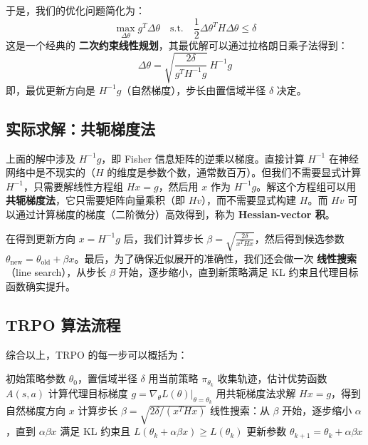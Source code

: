 \documentclass[lang=cn,zihao=-4,a4paper,fontset=windows]{beautybook}
\begin{document}
于是，我们的优化问题简化为：
\[
\max_{\Delta\theta} g^T \Delta\theta \quad \text{s.t.} \quad \frac{1}{2} \Delta\theta^T H \Delta\theta \le \delta
\]
这是一个经典的 \textbf{二次约束线性规划}，其最优解可以通过拉格朗日乘子法得到：
\[
\Delta\theta = \sqrt{\frac{2\delta}{g^T H^{-1} g}} \, H^{-1} g
\]
即，最优更新方向是 \(H^{-1} g\)（自然梯度），步长由置信域半径 \(\delta\) 决定。

\subsection{实际求解：共轭梯度法}

上面的解中涉及 \(H^{-1} g\)，即 Fisher 信息矩阵的逆乘以梯度。直接计算 \(H^{-1}\) 在神经网络中是不现实的（\(H\) 的维度是参数个数，通常数百万）。但我们不需要显式计算 \(H^{-1}\)，只需要解线性方程组 \(H x = g\)，然后用 \(x\) 作为 \(H^{-1} g\)。解这个方程组可以用 \textbf{共轭梯度法}，它只需要矩阵向量乘积（即 \(H v\)），而不需要显式构建 \(H\)。而 \(H v\) 可以通过计算梯度的梯度（二阶微分）高效得到，称为 \textbf{Hessian-vector 积}。

在得到更新方向 \(x = H^{-1} g\) 后，我们计算步长 \(\beta = \sqrt{\frac{2\delta}{x^T H x}}\)，然后得到候选参数 \(\theta_{\text{new}} = \theta_{\text{old}} + \beta x\)。最后，为了确保近似展开的准确性，我们还会做一次 \textbf{线性搜索}（line search），从步长 \(\beta\) 开始，逐步缩小，直到新策略满足 KL 约束且代理目标函数确实提升。

\subsection{TRPO 算法流程}

综合以上，TRPO 的每一步可以概括为：

\begin{algorithm}[H]
\caption{TRPO 算法}
\begin{algorithmic}[1]
\REQUIRE 初始策略参数 $\theta_0$，置信域半径 $\delta$
    \STATE 用当前策略 $\pi_{\theta_k}$ 收集轨迹，估计优势函数 $A(s,a)$
    \STATE 计算代理目标梯度 $g = \nabla_\theta L(\theta)|_{\theta=\theta_k}$
    \STATE 用共轭梯度法求解 $H x = g$，得到自然梯度方向 $x$
    \STATE 计算步长 $\beta = \sqrt{2\delta / (x^T H x)}$
    \STATE 线性搜索：从 $\beta$ 开始，逐步缩小 $\alpha$，直到
        \STATE \quad $\alpha \beta x$ 满足 KL 约束且 $L(\theta_k + \alpha\beta x) \ge L(\theta_k)$
    \STATE 更新参数 $\theta_{k+1} = \theta_k + \alpha\beta x$
\ENDFOR
\end{algorithmic}
\end{algorithm}
\end{document}

